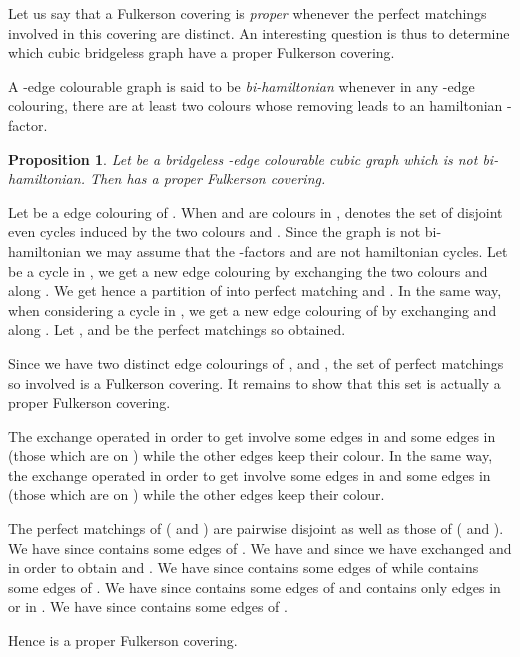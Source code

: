 \documentclass{amsart}
\newtheorem{prop}[thm]{Proposition}
\theoremstyle{definition}
\theoremstyle{remark}
\newenvironment{prf}{{\bf \noindent Proof } }{\hfill\\}
\begin{document}
Let us say that a Fulkerson covering is {\em proper} whenever the
 perfect matchings involved in this covering are distinct. An
interesting question is thus to determine which cubic bridgeless
graph have a proper Fulkerson covering.

A -edge colourable graph is said to be {\em bi-hamiltonian} whenever in any
-edge colouring, there are at least two colours whose removing leads to an
hamiltonian -factor.

\begin{prop} \label{Proposition:PropernonHamiltonian}
Let  be a bridgeless -edge colourable cubic graph which is not bi-hamiltonian. Then  has a
proper Fulkerson covering.
\end{prop}
\begin{prf}
Let  be a  edge
colouring of . When  and  are colours in
,   denotes the set of disjoint
even cycles induced by the two colours  and .
\newline Since the graph  is not bi-hamiltonian we may assume that the
-factors  and  are not hamiltonian
cycles.
Let  be a
cycle in , we get a new edge colouring
 by exchanging the two colours  and  along
. We get hence a partition of  into  perfect matching
 and . In the same way, when
considering a cycle  in , we get a new
edge colouring  of  by exchanging  and
 along . Let , and  be
the  perfect matchings so obtained.

Since we have two distinct edge colourings of ,
and , the set of  perfect matchings so
involved
 is a
Fulkerson covering. It remains to show that this set is actually a
proper Fulkerson covering.

The exchange operated in
order to get  involve some edges in  and some
edges in  (those which are on ) while the other edges
keep their colour. In the same way,  the exchange operated in order
to get  involve some edges in  and some edges in
 (those which are on ) while the other edges keep
their colour.

The  perfect matchings of  ( and
 ) are pairwise disjoint as well as those of 
( and ).  We have  since  contains some edges of . We
have  and  since we have exchanged  and 
in order to obtain  and . We have
 since  contains some edges
of  while  contains some edges of . We
have  since  contains some
edges of  and  contains only edges in 
or in . We have  since
 contains some edges of .

Hence
 is a
proper Fulkerson covering.

\end{prf}
\end{document}
